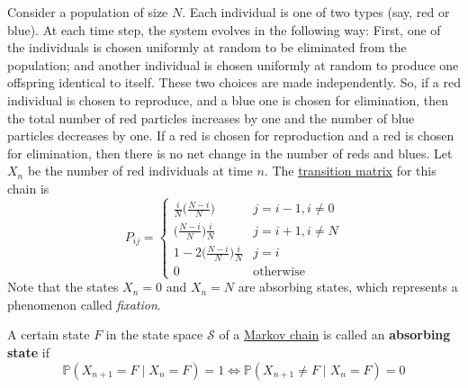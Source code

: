   \begin{example}
    \label{ex:discrete-moran-model}
    Consider a population of size $N$. Each individual is one of two types (say, red or blue). At each time step, the system evolves in the following way: First, one of the individuals is chosen uniformly at random to be eliminated from the population; and another individual is chosen uniformly at random to produce one offspring identical to itself. These two choices are made independently. So, if a red individual is chosen to reproduce, and a blue one is chosen for elimination, then the total number of red particles increases by one and the number of blue particles decreases by one. If a red is chosen for reproduction and a red is chosen for elimination, then there is no net change in the number of reds and blues. Let $X_n$ be the number of red individuals at time $n$. The \hyperref[def:transition-matrix]{transition matrix} for this chain is
    \begin{equation}
      P_{i j} = \begin{cases}
      \frac{i}{N} \bigg(\frac{N-i}{N} \bigg) & j=i-1, i \neq 0 \\
      \bigg(\frac{N-i}{N} \bigg) \frac{i}{N} & j=i+1, i \neq N \\
      1 - 2 \bigg(\frac{N-i}{N} \bigg) \frac{i}{N} & j = i \\
      0 & \text{otherwise}
      \end{cases}
    \end{equation}
    Note that the states $X_n = 0$ and $X_n = N$ are absorbing states, which represents a phenomenon called \textit{fixation}. 
  \end{example}

  \begin{definition}
    \label{def:absorbing-state}
    A certain state $F$ in the state space $\mathcal{S}$ of a \hyperref[def:markov-chain]{Markov chain} is called an \textbf{absorbing state} if
    \begin{equation}
      \mathbb{P}(X_{n+1} = F \; | \; X_n = F) = 1 \iff \mathbb{P}(X_{n+1} \neq F \; | \; X_n = F) = 0
    \end{equation}
  \end{definition}

